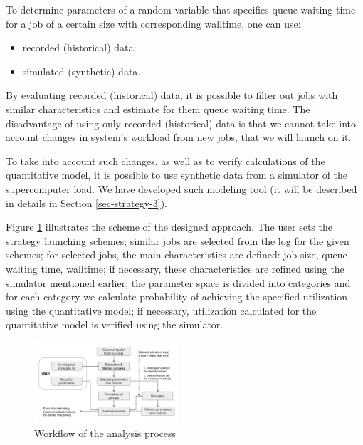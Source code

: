To determine parameters of a random variable that specifies queue waiting time for a job of a certain size with corresponding walltime, one can use:
\begin{itemize}
    \item recorded (historical) data;
    \item simulated (synthetic) data.
\end{itemize}

By evaluating recorded (historical) data, it is possible to filter out jobs with similar characteristics and estimate for them queue waiting time. The disadvantage of using only recorded (historical) data is that we cannot take into account changes in system's workload from new jobs, that we will launch on it.

To take into account such changes, as well as to verify calculations of the quantitative model, it is possible to use synthetic data from a simulator of the supercomputer load. We have developed such modeling tool (it will be described in details in Section \ref{sec-strategy-3}).

Figure \ref{fig-analysis-workflow} illustrates the scheme of the designed approach. The user sets the strategy launching schemes; similar jobs are selected from the log for the given schemes; for selected jobs, the main characteristics are defined: job size, queue waiting time, walltime; if necessary, these characteristics are refined using the simulator mentioned earlier; the parameter space is divided into categories and for each category we calculate probability of achieving the specified utilization using the quantitative model; if necessary, utilization calculated for the quantitative model is verified using the simulator.

\begin{figure}
    \centering
    \includegraphics[width=0.48\textwidth]{pics/analysis-workflow.png}
    \caption{Workflow of the analysis process}
    \label{fig-analysis-workflow} 
\end{figure}
